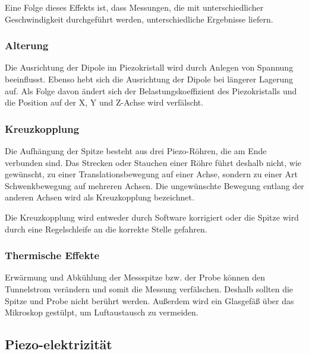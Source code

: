 Eine Folge dieses Effekts ist, dass Messungen, die mit unterschiedlicher Geschwindigkeit durchgeführt werden, unterschiedliche Ergebnisse liefern.

\subsubsection{Alterung}
Die Ausrichtung der Dipole im Piezokristall wird durch Anlegen von Spannung beeinflusst.
Ebenso hebt sich die Ausrichtung der Dipole bei längerer Lagerung auf.
Als Folge davon ändert sich der Belastungskoeffizient des Piezokristalls und die Position auf der X, Y und Z-Achse wird verfälscht.

\subsubsection{Kreuzkopplung}

Die Aufhängung der Spitze besteht aus drei Piezo-Röhren, die am Ende verbunden sind.
Das Strecken oder Stauchen einer Röhre führt deshalb nicht, wie gewünscht, zu einer Translationsbewegung auf einer Achse, sondern zu einer Art Schwenkbewegung auf mehreren Achsen.
Die ungewünschte Bewegung entlang der anderen Achsen wird als Kreuzkopplung bezeichnet.

Die Kreuzkopplung wird entweder durch Software korrigiert oder die Spitze wird durch eine Regelschleife an die korrekte Stelle gefahren.

\subsubsection{Thermische Effekte}
Erwärmung und Abkühlung der Messspitze bzw. der Probe können den Tunnelstrom verändern und somit die Messung verfälschen.
Deshalb sollten die Spitze und Probe nicht berührt werden.
Außerdem wird ein Glasgefäß über das Mikroskop gestülpt, um Luftaustausch zu vermeiden.


\subsection{Piezo-elektrizität}